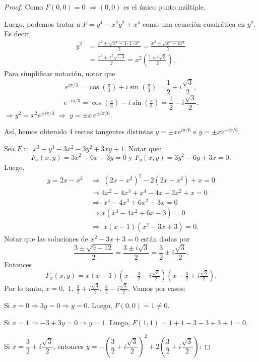 \documentclass[12pt,a4paper]{article}
\theoremstyle{plain}
\begin{document}
\begin{proof}
	Como $F(0,0)=0$ $\Rightarrow(0,0)$ es el único punto múltiple.

	Luego, podemos tratar a $F=y^4-x^2y^2+x^4$ como una ecuación cuadrática en $y^2$. Es decir,
	\begin{align*}
	  y^2 &= \frac{x^2\pm\sqrt{x^4-4\cdot 1\cdot x^4}}{2} = \frac{x^2\pm\sqrt{x^4-4x^4}}{2}\\
		  &= \frac{x^2\pm x^2\sqrt{-3}}{2} = x^2\!\left(\frac{1\pm i\sqrt{3}}{2}\right).
	\end{align*}
	Para simplificar notación, notar que
	\[
	  e^{i\pi/3}=\cos\!\left(\tfrac{\pi}{3}\right)+i\sin\!\left(\tfrac{\pi}{3}\right)=\frac{1}{2}+i\frac{\sqrt{3}}{2},
	\]
	\[
	  e^{-i\pi/3}=\cos\!\left(\tfrac{\pi}{3}\right)-i\sin\!\left(\tfrac{\pi}{3}\right)=\frac{1}{2}-i\frac{\sqrt{3}}{2}.
	\]
	$\Rightarrow y^2=x^2 e^{\pm i\pi/3}\;\Rightarrow\; y=\pm x\,e^{\pm i\pi/6}$. \par
	Así, hemos obtenido 4 rectas tangentes distintas $y=\pm xe^{i\pi/6}$ e $y=\pm xe^{-i\pi/6}$.

	\bigskip
	 Sea $F:=x^3+y^3-3x^2-3y^2+3xy+1$. Notar que:
	\[
	  F_x(x,y)=3x^2-6x+3y=0 \text{ y } F_y(x,y)=3y^2-6y+3x=0.
	\]
	Luego,
	\begin{align*}
		y=2x-x^2\;&\Rightarrow\;(2x-x^2)^2-2(2x-x^2)+x=0 \\
		&\Rightarrow 4x^2-4x^3+x^4-4x+2x^2+x=0 \\
		&\Rightarrow\; x^4-4x^3+6x^2-3x=0 \\
		&\Rightarrow x(x^3-4x^2+6x-3)=0 \\
		&\Rightarrow\; x(x-1)(x^2-3x+3)=0
	.\end{align*}
	Notar que las soluciones de $x^2-3x+3=0$ están dadas por
	\[
	  \frac{3\pm\sqrt{9-12}}{2}=\frac{3\pm i\sqrt{3}}{2}=\frac{3}{2}\pm i\frac{\sqrt{3}}{2}.
	\]
	Entonces
	\[
	  F_x(x,y)=x(x-1)\!\left(x-\tfrac{3}{2}-i\tfrac{\sqrt{3}}{2}\right)\!\left(x-\tfrac{3}{2}+i\tfrac{\sqrt{3}}{2}\right).
	\]
	Por lo tanto, $x=0,\;1,\;\tfrac{3}{2}+i\tfrac{\sqrt{3}}{2},\;\tfrac{3}{2}-i\tfrac{\sqrt{3}}{2}$. Vamos por casos: \par

	Si $x=0\Rightarrow 3y=0\Rightarrow y=0$. Luego, $F(0,0)=1\neq 0$. \par

	Si $x=1\Rightarrow -3+3y=0\Rightarrow y=1$. Luego, $F(1,1)=1+1-3-3+3+1=0$.\par

	Si $x=\dfrac{3}{2}+i\dfrac{\sqrt{3}}{2}$, entonces $y=-\left(\dfrac{3}{2}+i\dfrac{\sqrt{3}}{2}\right)^2+2\left(\dfrac{3}{2}+i\dfrac{\sqrt{3}}{2}\right)$:


\end{proof}
\end{document}
